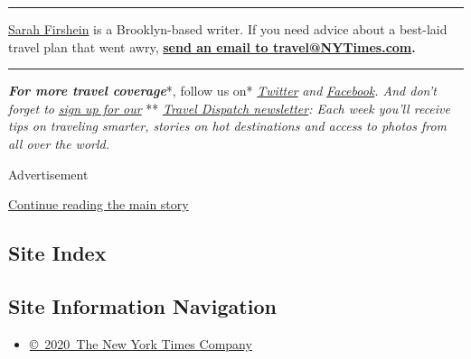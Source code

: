 \begin{center}\rule{0.5\linewidth}{\linethickness}\end{center}

\href{https://twitter.com/sfirshein?lang=en}{Sarah Firshein} is a
Brooklyn-based writer. If you need advice about a best-laid travel plan
that went awry, \textbf{\href{mailto:travel@NYTimes.com}{send an email
to travel@NYTimes.com}.}

\begin{center}\rule{0.5\linewidth}{\linethickness}\end{center}

\emph{\textbf{For more travel coverage}}*, follow us on*
\href{https://twitter.com/nytimestravel}{\emph{Twitter}} \emph{and}
\href{https://www.facebookcorewwwi.onion/nytimestravel/}{\emph{Facebook}}\emph{.
And don't forget to}
\href{https://www.nytimes3xbfgragh.onion/newsletters/traveldispatch?action=click\&module=inline\&pgtype=Article}{\emph{sign
up for our}} **
\href{https://www.nytimes3xbfgragh.onion/newsletters/traveldispatch}{\emph{Travel
Dispatch newsletter}}\emph{: Each week you'll receive tips on traveling
smarter, stories on hot destinations and access to photos from all over
the world.}

Advertisement

\protect\hyperlink{after-bottom}{Continue reading the main story}

\hypertarget{site-index}{%
\subsection{Site Index}\label{site-index}}

\hypertarget{site-information-navigation}{%
\subsection{Site Information
Navigation}\label{site-information-navigation}}

\begin{itemize}
\tightlist
\item
  \href{https://help.nytimes3xbfgragh.onion/hc/en-us/articles/115014792127-Copyright-notice}{©~2020~The
  New York Times Company}
\end{itemize}

